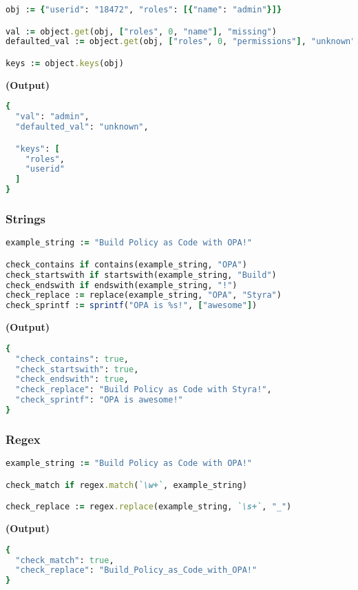 \documentclass[twocolumn]{article}
\begin{document}
\begin{lstlisting}[language=Ruby]
obj := {"userid": "18472", "roles": [{"name": "admin"}]}

val := object.get(obj, ["roles", 0, "name"], "missing")
defaulted_val := object.get(obj, ["roles", 0, "permissions"], "unknown")

keys := object.keys(obj)
\end{lstlisting}



\textbf{\tiny{(Output)}}
\begin{lstlisting}[language=Ruby]
{
  "val": "admin",
  "defaulted_val": "unknown",

  "keys": [
    "roles",
    "userid"
  ]
}
\end{lstlisting}



\vspace{-1em}
\subsubsection*{Strings}

\begin{lstlisting}[language=Ruby]
example_string := "Build Policy as Code with OPA!"

check_contains if contains(example_string, "OPA")
check_startswith if startswith(example_string, "Build")
check_endswith if endswith(example_string, "!")
check_replace := replace(example_string, "OPA", "Styra")
check_sprintf := sprintf("OPA is %s!", ["awesome"])
\end{lstlisting}



\textbf{\tiny{(Output)}}
\begin{lstlisting}[language=Ruby]
{
  "check_contains": true,
  "check_startswith": true,
  "check_endswith": true,
  "check_replace": "Build Policy as Code with Styra!",
  "check_sprintf": "OPA is awesome!"
}
\end{lstlisting}



\vspace{-1em}
\subsubsection*{Regex}

\begin{lstlisting}[language=Ruby]
example_string := "Build Policy as Code with OPA!"

check_match if regex.match(`\w+`, example_string)

check_replace := regex.replace(example_string, `\s+`, "_")
\end{lstlisting}



\textbf{\tiny{(Output)}}
\begin{lstlisting}[language=Ruby]
{
  "check_match": true,
  "check_replace": "Build_Policy_as_Code_with_OPA!"
}
\end{lstlisting}
\end{document}
